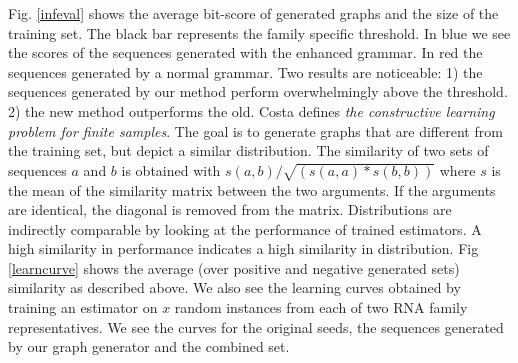 \documentclass{article}
\begin{document}
Fig. \ref{infeval} shows the average bit-score of generated graphs
and the size of the training set. The black bar represents the family specific 
threshold. In blue we see the scores of the sequences generated with the
enhanced grammar. In red the sequences generated by a normal grammar. 
Two results are noticeable: 1) the sequences generated by our method
perform overwhelmingly above the threshold. 2) the new method outperforms
the old. 
Costa \cite{costa16} defines \emph{the constructive learning problem for 
finite samples}.
The goal is to generate graphs that are different from the training set,
but depict a similar distribution.
The similarity of two sets of sequences $a$ and $b$ 
is obtained with $s(a,b)/\sqrt{(s(a,a)*s(b,b))}$ where $s$ is the mean of the
similarity matrix between the two arguments. If the arguments are identical,
the diagonal is removed from the matrix.
Distributions are indirectly comparable by looking at the performance 
of trained estimators. A high similarity in performance indicates a high
similarity in distribution.
Fig \ref{learncurve} shows the average (over positive and negative generated sets)
similarity as described above. 
We also see the learning curves obtained by training an estimator
on $x$ random instances from each of two RNA family representatives.
We see the curves for the original seeds, the sequences generated by 
our graph generator and the combined set. 
\end{document}
